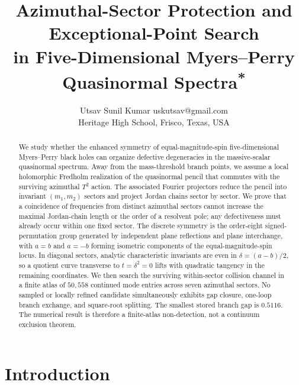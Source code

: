 \documentclass[10pt]{article}
\title{Azimuthal-Sector Protection and Exceptional-Point Search\\
in Five-Dimensional Myers--Perry Quasinormal
Spectra\texorpdfstring{\textsuperscript{*}}{}}
\author{\name Utsav Sunil Kumar \email uskutsav@gmail.com \\
        \addr Heritage High School, Frisco, Texas, USA}
\theoremstyle{plain}
\begin{document}
\maketitle

\renewcommand{\thefootnote}{\fnsymbol{footnote}}
\renewcommand{\thefootnote}{\arabic{footnote}}
\setcounter{footnote}{0}

\begin{abstract}
We study whether the enhanced symmetry of equal-magnitude-spin five-dimensional
Myers--Perry black holes can organize defective degeneracies in the
massive-scalar quasinormal spectrum. Away from the mass-threshold branch
points, we assume a local holomorphic Fredholm realization of the quasinormal
pencil that commutes with the surviving azimuthal $T^2$ action. The associated
Fourier projectors reduce the pencil into invariant $(m_1,m_2)$ sectors and
project Jordan chains sector by sector. We prove that a coincidence of
frequencies from distinct azimuthal sectors cannot increase the maximal
Jordan-chain length or the order of a resolvent pole; any defectiveness must
already occur within one fixed sector. The discrete symmetry is the order-eight
signed-permutation group generated by independent plane reflections and plane
interchange, with $a=b$ and $a=-b$ forming isometric components of the
equal-magnitude-spin locus. In diagonal sectors, analytic characteristic
invariants are even in $\delta=(a-b)/2$, so a quotient curve transverse to
$t=\delta^2=0$ lifts with quadratic tangency in the remaining coordinates. We
then search the surviving within-sector collision channel in a finite atlas of
$50{,}558$ continued mode entries across seven azimuthal sectors. No sampled or
locally refined candidate simultaneously exhibits gap closure, one-loop branch
exchange, and square-root splitting. The smallest stored branch gap is
$0.5116$. The numerical result is therefore a finite-atlas non-detection, not a
continuum exclusion theorem.
\end{abstract}

\section{Introduction}
\end{document}
